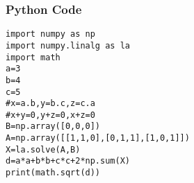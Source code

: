 \documentclass{beamer}
\begin{document}
\begin{frame}[fragile]
\frametitle{Python Code}
   \begin{lstlisting}
import numpy as np
import numpy.linalg as la
import math
a=3
b=4
c=5
#x=a.b,y=b.c,z=c.a
#x+y=0,y+z=0,x+z=0
B=np.array([0,0,0])
A=np.array([[1,1,0],[0,1,1],[1,0,1]])
X=la.solve(A,B)
d=a*a+b*b+c*c+2*np.sum(X)
print(math.sqrt(d))
   \end{lstlisting}
\end{frame}
\end{document}
